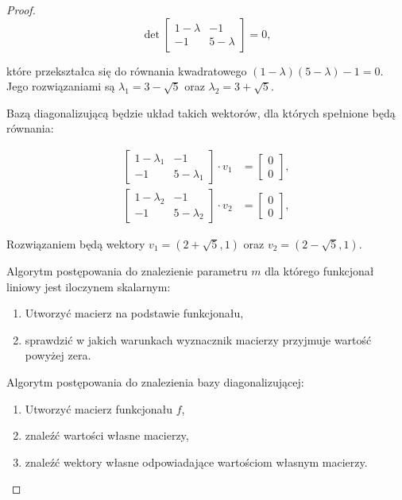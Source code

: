 \documentclass[11pt]{article}
\theoremstyle{definition}
\begin{document}
\begin{proof}
    $$\det \begin{bmatrix}
            1-\lambda & -1        \\
            -1        & 5-\lambda
        \end{bmatrix} = 0,$$

    które przekształca się do równania kwadratowego $(1-\lambda)(5-\lambda) -1 = 0.$ Jego rozwiązaniami są $\lambda_1 = 3-\sqrt5$ oraz $\lambda_2=3+\sqrt5$.

    Bazą diagonalizującą będzie układ takich wektorów, dla których spełnione będą równania:

    \begin{align*}
        \begin{bmatrix}
            1-\lambda_1 & -1          \\
            -1          & 5-\lambda_1
        \end{bmatrix} \cdot v_1  & = \begin{bmatrix}0\\0\end{bmatrix},  \\
        \begin{bmatrix}
            1-\lambda_2 & -1          \\
            -1          & 5-\lambda_2
        \end{bmatrix} \cdot v_2 & = \begin{bmatrix}0\\0\end{bmatrix},
    \end{align*}

    Rozwiązaniem będą wektory $v_1 = (2+\sqrt5, 1)$ oraz $v_2 = (2-\sqrt5, 1)$.

    Algorytm postępowania do znalezienie parametru $m$ dla którego funkcjonał liniowy jest iloczynem skalarnym:
    \begin{enumerate}
        \item Utworzyć macierz na podstawie funkcjonału,
        \item sprawdzić w jakich warunkach wyznacznik macierzy przyjmuje wartość powyżej zera.
    \end{enumerate}

    Algorytm postępowania do znalezienia bazy diagonalizującej:

    \begin{enumerate}
        \item Utworzyć macierz funkcjonału $f$,
        \item znaleźć wartości własne macierzy,
        \item znaleźć wektory własne odpowiadające wartościom własnym macierzy.
    \end{enumerate}

\end{proof}
\end{document}
